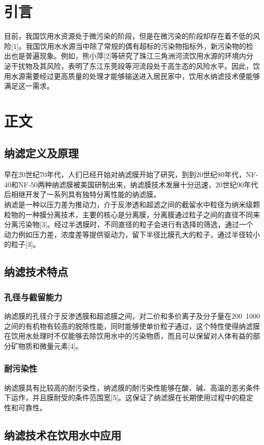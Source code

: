 \begin{multicols}{2}
    \section{引言}
    目前，我国饮用水资源处于微污染的阶段，但是在微污染的阶段却存在着不低的风险[1]。我国饮用水水源当中除了常规的偶有超标的污染物指标外，新污染物的检出也是普遍现象。例如，熊小萍[2]等研究了珠江三角洲河流饮用水源的环境内分泌干扰物及其风险，表明了东江东莞段等河流段处于高生态的风险水平。因此，饮用水源需要经过更高质量的处理才能够输送进入居民家中，饮用水纳滤技术便能够满足这一需求。
    \section{正文}     
    \subsection{纳滤定义及原理}
    早在20世纪70年代，人们已经开始对纳滤膜开始了研究，到到20世纪80年代，NF-40和NF-50两种纳滤膜被美国研制出来，纳滤膜技术发展十分迅速，20世纪90年代后相继开发了一系列具有独特分离性能的纳滤膜。\\
    纳滤是一种以压力差为推动力，介于反渗透和超滤之间的截留水中粒径为纳米级颗粒物的一种膜分离技术，主要的核心是分离膜，分离膜通过粒子之间的直径不同来分离污染物[3]。经过半透膜时，不同直径的粒子会进行有选择的筛选，通过一个动力例如压力差，浓度差等提供驱动力，留下半径比膜孔大的粒子，通过半径较小的粒子[3]。
      \subsection{纳滤技术特点} 
      \subsubsection{孔径与截留能力}
    纳滤膜的孔径介于反渗透膜和超滤膜之间，对二价和多价离子及分子量在200~1000之间的有机物有较高的脱除性能，同时能够使单价粒子通过，这个特性使得纳滤膜在饮用水处理时不仅能够去除饮用水中的污染物质，而且可以保留对人体有益的部分矿物质和微量元素[4]。
      \subsubsection{耐污染性}
    纳滤膜具有比较高的耐污染性，纳滤膜的耐污染性能够在酸、碱、高温的恶劣条件下运作，并且膜耐受的条件范围宽[5]。这保证了纳滤膜在长期使用过程中的稳定性和可靠性。
    \subsection{纳滤技术在饮用水中应用}

\end{multicols}
